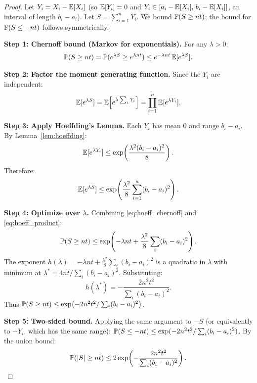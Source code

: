 \documentclass[11pt,a4paper]{article}
\begin{document}
\begin{proof}
Let $Y_i = X_i - \mathbb{E}[X_i]$ (so $\mathbb{E}[Y_i] = 0$ and
$Y_i \in [a_i - \mathbb{E}[X_i],\, b_i - \mathbb{E}[X_i]]$, an interval of
length $b_i - a_i$).  Let $S = \sum_{i=1}^n Y_i$.  We bound
$\mathbb{P}(S \geq nt)$; the bound for
$\mathbb{P}(S \leq -nt)$ follows symmetrically.

\textbf{Step 1: Chernoff bound (Markov for exponentials).}
For any $\lambda > 0$:
\begin{equation}
  \mathbb{P}(S \geq nt)
  = \mathbb{P}(e^{\lambda S} \geq e^{\lambda nt})
  \leq e^{-\lambda nt}\, \mathbb{E}[e^{\lambda S}].
  \label{eq:hoeff_chernoff}
\end{equation}

\textbf{Step 2: Factor the moment generating function.}
Since the $Y_i$ are independent:
\begin{equation}
  \mathbb{E}[e^{\lambda S}]
  = \mathbb{E}\!\left[e^{\lambda \sum_i Y_i}\right]
  = \prod_{i=1}^n \mathbb{E}[e^{\lambda Y_i}].
  \label{eq:hoeff_factor}
\end{equation}

\textbf{Step 3: Apply Hoeffding's Lemma.}
Each $Y_i$ has mean $0$ and range $b_i - a_i$.  By
Lemma~\ref{lem:hoeffding}:
\begin{equation}
  \mathbb{E}[e^{\lambda Y_i}]
  \leq \exp\!\left(\frac{\lambda^2 (b_i - a_i)^2}{8}\right).
  \label{eq:hoeff_each}
\end{equation}
Therefore:
\begin{equation}
  \mathbb{E}[e^{\lambda S}]
  \leq \exp\!\left(\frac{\lambda^2}{8}
    \sum_{i=1}^n (b_i - a_i)^2\right).
  \label{eq:hoeff_product}
\end{equation}

\textbf{Step 4: Optimize over $\lambda$.}
Combining \eqref{eq:hoeff_chernoff} and \eqref{eq:hoeff_product}:
\begin{equation}
  \mathbb{P}(S \geq nt)
  \leq \exp\!\left(-\lambda nt
    + \frac{\lambda^2}{8} \sum_i (b_i - a_i)^2\right).
  \label{eq:hoeff_combined}
\end{equation}
The exponent $h(\lambda) = -\lambda nt +
\frac{\lambda^2}{8} \sum_i (b_i - a_i)^2$ is a quadratic in
$\lambda$ with minimum at
$\lambda^* = 4nt / \sum_i (b_i - a_i)^2$.  Substituting:
\begin{equation}
  h(\lambda^*) = -\frac{2n^2 t^2}{\sum_i (b_i - a_i)^2}.
  \label{eq:hoeff_optimal}
\end{equation}
Thus $\mathbb{P}(S \geq nt) \leq
\exp\!\left(-2n^2 t^2 / \sum_i (b_i - a_i)^2\right)$.

\textbf{Step 5: Two-sided bound.}
Applying the same argument to $-S$ (or equivalently to $-Y_i$,
which has the same range):
$\mathbb{P}(S \leq -nt) \leq
\exp(-2n^2 t^2 / \sum_i (b_i - a_i)^2)$.
By the union bound:
\begin{equation}
  \mathbb{P}(|S| \geq nt)
  \leq 2\exp\!\left(
    -\frac{2n^2 t^2}{\sum_i (b_i - a_i)^2}\right). \qedhere
\end{equation}
\end{proof}
\end{document}
